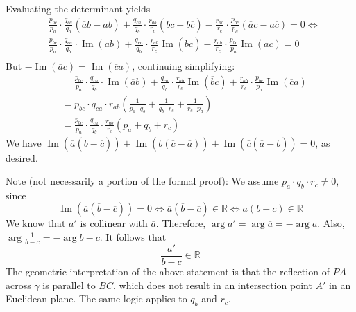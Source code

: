 \begin{enumerate}
 Evaluating the determinant yields\begin{align*}&\frac{p_{bc}}{p_a}\cdot\frac{q_{ca}}{q_b}(\overline a b-a\overline b)+\frac{q_{ca}}{q_b}\cdot\frac{r_{ab}}{r_c}(\overline b c-b\overline c)-\frac{r_{ab}}{r_c}\cdot\frac{p_{bc}}{p_a}(\overline a c-a\overline c)=0\iff\\&\frac{p_{bc}}{p_a}\cdot\frac{q_{ca}}{q_b}\cdot \operatorname{Im}(\overline a b)+\frac{q_{ca}}{q_b}\cdot\frac{r_{ab}}{r_c}\operatorname{Im}(\overline b c)-\frac{r_{ab}}{r_c}\cdot\frac{p_{bc}}{p_a}\operatorname{Im}(\overline a c)=0\\\end{align*}
But $-\operatorname{Im}(\overline a c)=\operatorname{Im}(\overline c a)$, continuing simplifying:\begin{align*} &\quad\,\,\frac{p_{bc}}{p_a}\cdot\frac{q_{ca}}{q_b}\cdot \operatorname{Im}(\overline a b)+\frac{q_{ca}}{q_b}\cdot\frac{r_{ab}}{r_c}\operatorname{Im}(\overline b c)+\frac{r_{ab}}{r_c}\cdot \frac{p_{bc}}{p_a}\operatorname{Im}(\overline c a)\\&=p_{bc}\cdot q_{ca}\cdot r_{ab}\left(\frac{1}{p_a\cdot q_b}+\frac{1}{q_b\cdot r_c}+\frac{1}{r_c\cdot p_a}\right)\\&=\frac{p_{bc}}{p_a}\cdot\frac{q_{ca}}{q_b}\cdot \frac{r_{ab}}{r_c}(p_a+q_b+r_c)\end{align*}
We have $\operatorname{Im}(\overline a(\overline b-\overline c))+\operatorname{Im}(\overline b(\overline c-\overline a))+\operatorname{Im}(\overline c(\overline a-\overline b))=0$, as desired.

 Note (not necessarily a portion of the formal proof): We assume $p_a\cdot q_b\cdot r_c\neq 0$, since
 \[\operatorname{Im}(\overline a(\overline b-\overline c))=0\iff \overline a(\overline b-\overline c)\in\mathbb{R}\iff a(b-c)\in\mathbb{R}\]We know that $a'$ is collinear with $\overline a$. Therefore, $\arg{a'}=\arg{\overline a}=-\arg{a}$. Also, $\arg{\frac{1}{b-c}}=-\arg{b-c}$. It follows that
 \[\frac{a'}{b-c}\in\mathbb{R}\]The geometric interpretation of the above statement is that the reflection of $PA$ across $\gamma$ is parallel to $BC$, which does not result in an intersection point $A'$ in an Euclidean plane. The same logic applies to $q_b$ and $r_c$.

 


\end{enumerate}